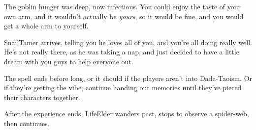 \begin{multicols}{2}
\begin{boxtext}
    The goblin hunger was deep, now infectious.
    You could enjoy the taste of your own arm, and it wouldn't actually be \emph{yours}, so it would be fine, and you would get a whole arm to yourself.

    \Gls{SnailTamer} arrives, telling you he loves all of you, and you're all doing really well.
    He's not really there, as he was taking a nap, and just decided to have a little dream with you guys to help everyone out.

\end{boxtext}

The spell ends before long, or it should if the players aren't into Dada-Taoism.
Or if they're getting the vibe, continue handing out memories until they've pieced their characters together.

After the experience ends, \gls{LifeElder} wanders past, stops to observe a spider-web, then continues.

\iftoggle{verbose}{
  \subsection{Broken Resolutions}

  If your table runs out of time for the night, and you need to wrap everything up quickly, switch to \gls{downtime} plans, and give each \gls{pc} \pgls{action}.
  If they want to negotiate with \gls{MindElder}, they might roll \roll{Intelligence}{Empathy}, or if they think it's time to kill those \glspl{ogre}, sleeping in their sepulchres.

  For some added drama, ask each player to roll under a cup, napkin, or sleeve.
  Leave the results hidden until everyone has decided what they want to do.
  One all results are in, determine the outcomes based entirely on the rolls.
  If \pgls{pc} spent the entire \gls{downtime} trying to redirect the river through \gls{shadepaths}, it could flood the \gls{sunway} and block snails from accessing \gls{ravencops}.
  Or if they spent their time trying to kill \glspl{ogre}, a failed roll could mean that \pgls{ogre} eats the \gls{pc} alive before marauding around \gls{ravencops}.
}{

  \subsection{No Way Home}

  If you want to run this arc over multiple sessions, or if the troupe find themselves stuck here over \gls{downtime}, the elven lands have plenty of reasons for characters to leave, disappear or get distracted.

}
\end{multicols}
